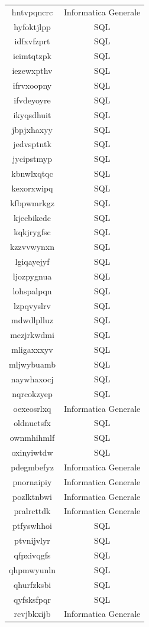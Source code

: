 \begin{longtable}{|c|c|}
hntvpqncrc & Informatica Generale \\
hyfoktjlpp & SQL \\
idfxvfzprt & SQL \\
ieimtqtzpk & SQL \\
iezewxpthv & SQL \\
ifrvxoopny & SQL \\
ifvdeyoyre & SQL \\
ikyqsdhuit & SQL \\
jbpjxhaxyy & SQL \\
jedvsptntk & SQL \\
jycipstmyp & SQL \\
kbnwlxqtqc & SQL \\
kexorxwipq & SQL \\
kfbpwmrkgz & SQL \\
kjecbikedc & SQL \\
kqkjrygfsc & SQL \\
kzzvvwynxn & SQL \\
lgiqayejyf & SQL \\
ljozpygnua & SQL \\
lohspalpqn & SQL \\
lzpqvyslrv & SQL \\
mdwdlplluz & SQL \\
mezjrkwdmi & SQL \\
mligaxxxyv & SQL \\
mljwybuamb & SQL \\
naywhaxocj & SQL \\
nqrcokzyep & SQL \\
oexeosrlxq & Informatica Generale \\
oldnuetsfx & SQL \\
ownmhihmlf & SQL \\
oxinyiwtdw & SQL \\
pdegmbefyz & Informatica Generale \\
pnornaipiy & Informatica Generale \\
pozlktnbwi & Informatica Generale \\
pralrcttdk & Informatica Generale \\
ptfyswhhoi & SQL \\
ptvnijvlyr & SQL \\
qfpxivqgfs & SQL \\
qhpmwyunln & SQL \\
qhurfzksbi & SQL \\
qyfsksfpqr & SQL \\
rcvjbkxijb & Informatica Generale \\

\end{longtable}

